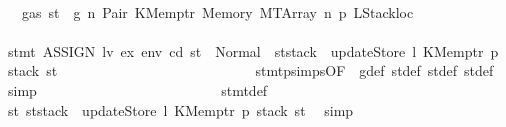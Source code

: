 \begin{isabellebody}
\ \ \ \ \ \ \ \ \ \ \ \ \ \ \ \ \ \ \ \ \ \ \ \ \isamarkupfalse%
\ {}{\isacharparenleft}{\kern0pt}{}{\isacharparenright}{\kern0pt}\ {\isacharbackquoteopen}{\isasymnot}\ gas\ st\ {\isasymle}\ g{\isacharbackquoteclose}\ n\ Pair\ KMemptr\ Memory\ MTArray\ n{}\ p{}\ LStackloc\isanewline
\ \ \ \ \ \ \ \ \ \ \ \ \ \ \ \ \ \ \ \ \ \ \ \ \isamarkupfalse%
\ {\isachardoublequoteopen}stmt\ {\isacharparenleft}{\kern0pt}ASSIGN\ lv\ ex{\isacharparenright}{\kern0pt}\ env\ cd\ st\ {\isacharequal}{\kern0pt}\ Normal\ {\isacharparenleft}{\kern0pt}{\isacharparenleft}{\kern0pt}{\isacharparenright}{\kern0pt}{\isacharcomma}{\kern0pt}\ st{\isacharprime}{\kern0pt}{\isacharprime}{\kern0pt}{\isacharprime}{\kern0pt}{\isasymlparr}stack\ {\isacharcolon}{\kern0pt}{\isacharequal}{\kern0pt}\ updateStore\ l\ {\isacharparenleft}{\kern0pt}KMemptr\ p{\isacharparenright}{\kern0pt}\ {\isacharparenleft}{\kern0pt}stack\ st{\isacharprime}{\kern0pt}{\isacharprime}{\kern0pt}{\isacharparenright}{\kern0pt}{\isasymrparr}{\isacharparenright}{\kern0pt}{\isachardoublequoteclose}\isanewline
\ \ \ \ \ \ \ \ \ \ \ \ \ \ \ \ \ \ \ \ \ \ \ \ \ \ \isamarkupfalse%
\ stmt{\isachardot}{\kern0pt}psimps{\isacharparenleft}{\kern0pt}{}{\isacharparenright}{\kern0pt}{\isacharbrackleft}{\kern0pt}OF\ {}{\isacharparenleft}{\kern0pt}{}{\isacharparenright}{\kern0pt}{\isacharbrackright}{\kern0pt}\ g{\isacharunderscore}{\kern0pt}def\ st{\isacharprime}{\kern0pt}{\isacharunderscore}{\kern0pt}def\ st{\isacharprime}{\kern0pt}{\isacharprime}{\kern0pt}{\isacharunderscore}{\kern0pt}def\ st{\isacharprime}{\kern0pt}{\isacharprime}{\kern0pt}{\isacharprime}{\kern0pt}{\isacharunderscore}{\kern0pt}def\ \isamarkupfalse%
\ simp\isanewline
\ \ \ \ \ \ \ \ \ \ \ \ \ \ \ \ \ \ \ \ \ \ \ \ \isamarkupfalse%
\ stmt{\isacharunderscore}{\kern0pt}def\ \isamarkupfalse%
\ {\isachardoublequoteopen}st{}{\isacharprime}{\kern0pt}{\isacharequal}{\kern0pt}\ st{\isacharprime}{\kern0pt}{\isacharprime}{\kern0pt}{\isacharprime}{\kern0pt}{\isasymlparr}stack\ {\isacharcolon}{\kern0pt}{\isacharequal}{\kern0pt}\ updateStore\ l\ {\isacharparenleft}{\kern0pt}KMemptr\ p{\isacharparenright}{\kern0pt}\ {\isacharparenleft}{\kern0pt}stack\ st{\isacharprime}{\kern0pt}{\isacharprime}{\kern0pt}{\isacharparenright}{\kern0pt}{\isasymrparr}{\isachardoublequoteclose}\ \isamarkupfalse%
\ simp\isanewline
\ \ \ \ \ \ \ \ \ \ \ \ \ \ \ \ \ \ \ \ \ \ \ \ \isamarkupfalse%

\end{isabellebody}
